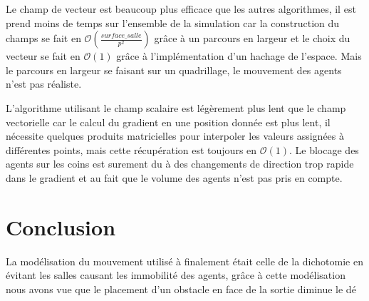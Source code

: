 \documentclass{article}
\newcommand{\bigo}{\mathcal{O}}
\begin{document}
Le champ de vecteur est beaucoup plus efficace que les autres algorithmes, il est
prend moins de temps sur l'ensemble de la simulation car la construction
du champs se fait en $\bigo\left(\frac{surface\_salle}{p^2}\right)$ grâce à un parcours en largeur
et le choix du vecteur se fait en $\bigo(1)$ grâce à l'implémentation d'un hachage de
l'espace. Mais le parcours en largeur se faisant sur un quadrillage, le mouvement
des agents n'est pas réaliste.

L'algorithme utilisant le champ scalaire est légèrement plus lent que le champ
vectorielle car le calcul du gradient en une position donnée est plus lent,
il nécessite quelques produits matricielles pour interpoler les valeurs assignées
à différentes points, mais cette récupération est toujours en $\bigo(1)$. Le blocage des
agents sur les coins est surement du à des changements de direction trop rapide
dans le gradient et au fait que le volume des agents n'est pas pris en compte.


\section{Conclusion}

La modélisation du mouvement utilisé à finalement était celle de la dichotomie en évitant les
salles causant les immobilité des agents, grâce à cette modélisation nous avons vue que
le placement d'un obstacle en face de la sortie diminue le dé
\end{document}
